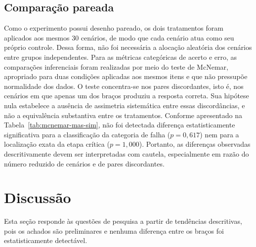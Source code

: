 \documentclass[sigconf]{acmart}
\begin{document}
\subsection{Comparação pareada}
\label{subsec:pareada}

\begin{table}[h]
	\centering
	\caption{Teste de McNemar para as métricas categóricas pareadas no experimento MAS-SIM.}
	\label{tab:mcnemar-mas-sim}
\end{table}

Como o experimento possui desenho pareado, os dois tratamentos foram aplicados aos mesmos 30 cenários, de modo que cada
cenário atua como seu próprio controle. Dessa forma, não foi necessária a alocação aleatória dos cenários entre grupos
independentes. Para as métricas categóricas de acerto e erro, as comparações inferenciais foram realizadas por meio do
teste de McNemar, apropriado para duas condições aplicadas aos mesmos itens e que não pressupõe normalidade dos dados.
O teste concentra-se nos pares discordantes, isto é, nos cenários em que apenas um dos braços produziu a resposta
correta. Sua hipótese nula estabelece a ausência de assimetria sistemática entre essas discordâncias, e não a
equivalência substantiva entre os tratamentos. Conforme apresentado na Tabela~\ref{tab:mcnemar-mas-sim}, não foi
detectada diferença estatisticamente significativa para a classificação da categoria de falha ($p = 0{,}617$) nem para
a localização exata da etapa crítica ($p = 1{,}000$). Portanto, as diferenças observadas descritivamente devem ser
interpretadas com cautela, especialmente em razão do número reduzido de cenários e de pares discordantes.
\section{Discussão}

Esta seção responde às questões de pesquisa a partir de tendências descritivas, pois os achados são preliminares e
nenhuma diferença entre os braços foi estatisticamente detectável.
\end{document}

